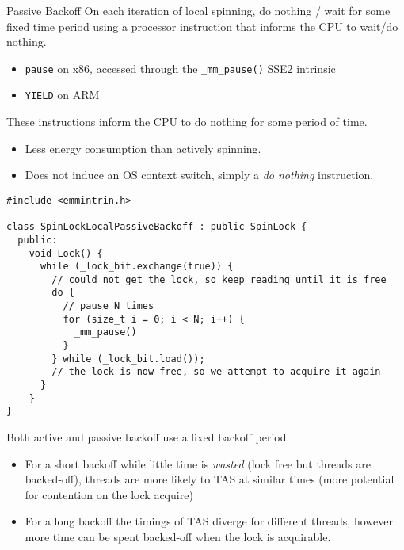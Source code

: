 \begin{definitionbox}{Passive Backoff}
	On each iteration of local spinning, do nothing / wait for some fixed time period using a processor instruction that informs the CPU to wait/do nothing.
	\begin{itemize}
		\item \texttt{pause} on x86, accessed through the \texttt{_mm_pause()} \href{https://www.intel.com/content/www/us/en/docs/intrinsics-guide/index.html#techs=SSE2}{SSE2 intrinsic}
		\item \texttt{YIELD} on ARM
	\end{itemize}
	These instructions inform the CPU to do nothing for some period of time.
	\begin{itemize}
		\item Less energy consumption than actively spinning.
		\item Does not induce an OS context switch, simply a \textit{do nothing} instruction.
	\end{itemize}
\end{definitionbox}
\begin{verbatim}
#include <emmintrin.h>

class SpinLockLocalPassiveBackoff : public SpinLock {
  public:
    void Lock() {
      while (_lock_bit.exchange(true)) { 
        // could not get the lock, so keep reading until it is free
        do {
          // pause N times
          for (size_t i = 0; i < N; i++) {
            _mm_pause()
          }
        } while (_lock_bit.load());
        // the lock is now free, so we attempt to acquire it again
      }
    }
}
\end{verbatim}

Both active and passive backoff use a fixed backoff period.
\begin{itemize}
	\item For a short backoff while little time is \textit{wasted} (lock free but threads are backed-off), threads are more likely to TAS at similar times (more potential for contention on the lock acquire)
	\item For a long backoff the timings of TAS diverge for different threads, however more time can be spent backed-off when the lock is acquirable.
\end{itemize}


